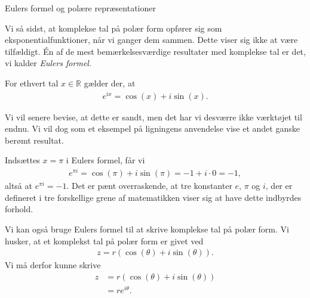 \documentclass[12pt]{article}
\begin{document}





\begin{center}
	\Huge
	Eulers formel og polære repræsentationer
\end{center}
Vi så sidst, at komplekse tal på polær form opfører sig som eksponentialfunktioner, når vi ganger dem sammen. Dette viser sig ikke at være tilfældigt. Én af de mest bemærkelsesværdige resultater med komplekse tal er det, vi kalder \textit{Eulers formel}.
\begin{setn}
	For ethvert tal $x \in \mathbb{R}$ gælder der, at 
	\begin{align*}
		e^{ix} = \cos(x) + i\sin(x).
	\end{align*}
\end{setn}
Vi vil senere bevise, at dette er sandt, men det har vi desværre ikke værktøjet til endnu. Vi vil dog som et eksempel på ligningens anvendelse vise et andet ganske berømt resultat.
\begin{exa}
	Indsættes $x = \pi$ i Eulers formel, får vi
	\begin{align*}
		e^{\pi i} = \cos(\pi) + i \sin(\pi) = -1 + i\cdot 0 = -1,
	\end{align*}
	altså at $e^{\pi i } = -1$. Det er pænt overraskende, at tre konstanter $e$, $\pi$ og $i$, der er defineret i tre 
	forskellige grene af matematikken viser sig at have dette indbyrdes forhold. 
\end{exa}
Vi kan også bruge Eulers formel til at skrive komplekse tal på polær form. Vi husker, at et komplekst tal på polær form er givet ved
\begin{align*}
	z = r(\cos(\theta)+ i \sin(\theta)).
\end{align*}
Vi må derfor kunne skrive
\begin{align*}
	z &= r(\cos(\theta)+ i \sin(\theta))\\
	&=re^{i\theta}.
\end{align*}
\end{document}
